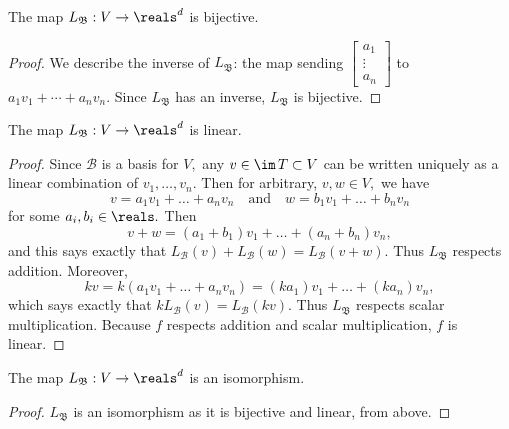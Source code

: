 The map $L_{\mathfrak{B}}: V \to \reals^d$ is bijective.

\begin{proof}
    We describe the inverse of $L_{\mathfrak{B}}$: the map sending $\begin{bmatrix}a_1\\\vdots\\a_n\end{bmatrix}$ to $a_1v_1+\cdots+a_nv_n.$ Since $L_{\mathfrak{B}}$ has an inverse, $L_{\mathfrak{B}}$ is bijective.
\end{proof}

The map $L_{\mathfrak{B}}: V \to \reals^d$ is linear.

\begin{proof}
    Since $\mathcal{B}$ is a basis for $V,$ any $v\in\im\,T\subset V$ can be written uniquely as a linear combination of $v_1,\dots,v_n.$
    Then for arbitrary, $v,w\in V,$ we have $$v=a_1v_1+\dots+a_nv_n\quad\text{and}\quad w=b_1v_1+\dots+b_nv_n$$ for some $a_i,b_i\in\reals.$
    Then $$v+w=(a_1+b_1)v_1+\dots+(a_n+b_n)v_n,$$ and this says exactly that $L_\mathcal{B}(v) + L_\mathcal{B}(w) = L_\mathcal{B}(v+w).$ Thus $L_{\mathfrak{B}}$ respects addition.
    Moreover, $$kv = k(a_1v_1+\dots+a_nv_n)=(ka_1)v_1+\dots+(ka_n)v_n,$$ which says exactly that $kL_\mathcal{B}(v)=L_\mathcal{B}(kv).$ Thus $L_{\mathfrak{B}}$ respects scalar multiplication. Because $f$ respects addition and scalar multiplication, $f$ is linear.
\end{proof}

The map $L_{\mathfrak{B}}: V \to \reals^d$ is an isomorphism.

\begin{proof}
    $L_{\mathfrak{B}}$ is an isomorphism as it is bijective and linear, from above.
\end{proof}